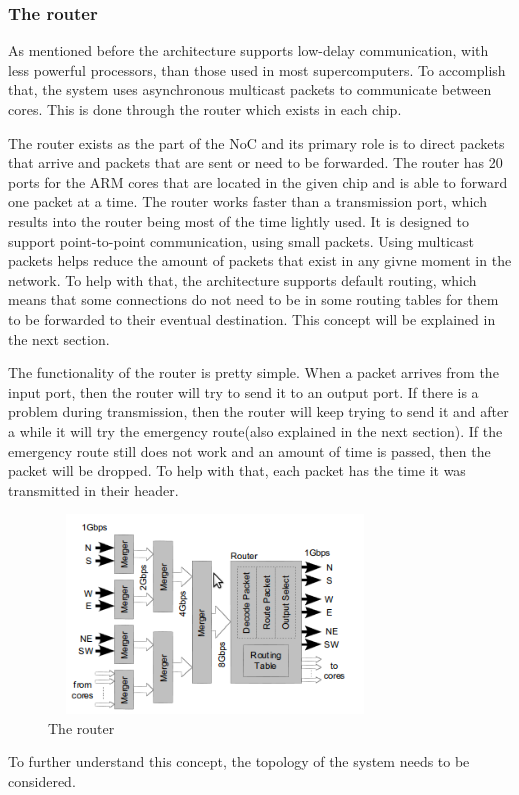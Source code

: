 \documentclass[12pt,a4paper]{article}
\begin{document}
\subsubsection{The router}
As mentioned before the architecture supports low-delay communication, with less powerful processors, than those used in most supercomputers. To accomplish that, the system uses asynchronous multicast packets to communicate between cores. This is done through the router which exists in each chip.

The router exists as the part of the NoC and its primary role is to direct packets that arrive and packets that are sent or need to be forwarded. The router has 20 ports for the ARM cores that are located in the given chip and is able to forward one packet at a time. The router works faster than a transmission port, which results into the router being most of the time lightly used. It is designed to support point-to-point communication, using small packets. Using multicast packets helps reduce the amount of packets that exist in any givne moment in the network. To help with that, the architecture supports default routing, which means that some connections do not need to be in some routing tables for them to be forwarded to their eventual destination. This concept will be explained in the next section.

The functionality of the router is pretty simple. When a packet arrives from the input port, then the router will try to send it to an output port. If there is a problem during transmission, then the router will keep trying to send it and after a while it will try the emergency route(also explained in the next section). If the emergency route still does not work and an amount of time is passed, then the packet will be dropped. To help with that, each packet has the time it was transmitted in their header.

\begin{figure}[h!]
\includegraphics[width=250pt,height=150pt,scale=2]{Pics/router.png}
\centering
\caption{The router\cite{navaridas2009understanding}}
\end{figure}
To further understand this concept, the topology of the system needs to be considered.
\end{document}
